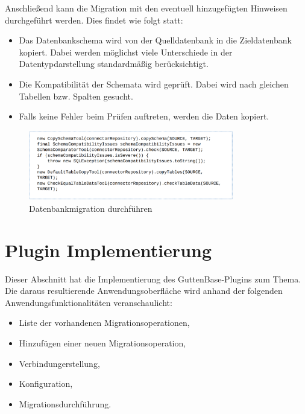 	
	Anschließend kann die Migration mit den eventuell hinzugefügten Hinweisen durchgeführt werden. Dies findet wie folgt statt:
	\begin{itemize}
		\item Das Datenbankschema wird von der Quelldatenbank in die Zieldatenbank kopiert. Dabei werden möglichst viele Unterschiede in der Datentypdarstellung standardmäßig berücksichtigt.
		\item Die Kompatibilität der Schemata wird geprüft. Dabei wird nach gleichen Tabellen bzw. Spalten gesucht.
		\item Falls keine Fehler beim Prüfen auftreten, werden die Daten kopiert.
	\end{itemize}
	\begin{figure}[H]
		\centering
		\includegraphics[width=0.8\textwidth]{images/gb/copy}
		\caption{Datenbankmigration durchführen}
		\label{img:gb/copy}
	\end{figure}
	
	
	
\section{Plugin Implementierung}
\label{sec:imp}

Dieser Abschnitt hat die Implementierung des GuttenBase-Plugins zum Thema. Die daraus resultierende Anwendungsoberfläche wird anhand der folgenden Anwendungsfunktionalitäten veranschaulicht:
\begin{itemize}
	\item Liste der vorhandenen Migrationsoperationen,
	\item Hinzufügen einer neuen Migrationsoperation,
	\item Verbindungerstellung,
	\item Konfiguration,
	\item Migrationsdurchführung.
\end{itemize}
